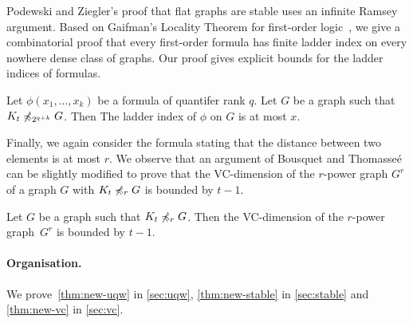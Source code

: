 Podewski and Ziegler's proof that flat graphs are stable uses an 
infinite Ramsey argument. Based on Gaifman's Locality Theorem for
first-order logic~\cite{gaifman1982local}, we give a combinatorial 
proof that every first-order formula has finite ladder index on every
nowhere dense class of graphs. Our proof gives explicit bounds for the
ladder indices of formulas. 

\begin{theorem}\label{thm:new-stable}
Let $\phi(x_1,\ldots, x_k)$ be a formula of quantifer rank $q$. 
Let $G$ be a graph such that $K_t\not\preccurlyeq_{2^{q+k}} G$. Then 
The ladder index of $\phi$ on $G$ is at most $x$. 
\end{theorem}

Finally, we again consider the formula stating that the distance
between two elements is at most $r$. 
We observe that an argument of Bousquet and 
Thomasse\'e~\cite{BousquetT15} can be slightly modified to prove that 
the VC-dimension of the $r$-power graph $G^r$ of a graph $G$
with $K_t\not\preccurlyeq_r G$ is bounded by $t-1$.

\begin{theorem}\label{thm:new-vc}
Let $G$ be a graph such that $K_t\not\preccurlyeq_r G$. Then the
VC-dimension of the $r$-power graph~$G^r$ is bounded by $t-1$. 
\end{theorem}

\paragraph{Organisation.}
We prove~\cref{thm:new-uqw} in \cref{sec:uqw}, 
\cref{thm:new-stable} in \cref{sec:stable} and
\cref{thm:new-vc} in \cref{sec:vc}. 
